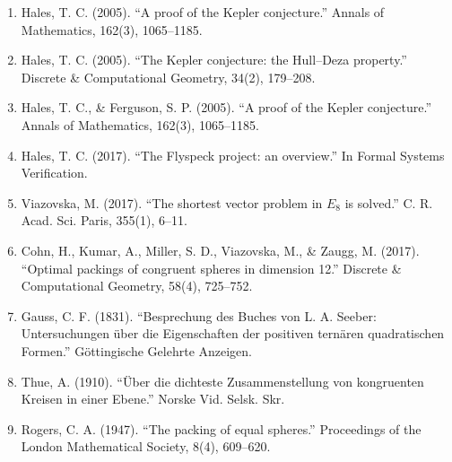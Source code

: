 \begin{enumerate}
\item Hales, T. C. (2005). ``A proof of the Kepler conjecture.'' Annals of Mathematics, 162(3), 1065--1185.
\item Hales, T. C. (2005). ``The Kepler conjecture: the Hull--Deza property.'' Discrete \& Computational Geometry, 34(2), 179--208.
\item Hales, T. C., \& Ferguson, S. P. (2005). ``A proof of the Kepler conjecture.'' Annals of Mathematics, 162(3), 1065--1185.
\item Hales, T. C. (2017). ``The Flyspeck project: an overview.'' In Formal Systems Verification.
\item Viazovska, M. (2017). ``The shortest vector problem in $E_8$ is solved.'' C. R. Acad. Sci. Paris, 355(1), 6--11.
\item Cohn, H., Kumar, A., Miller, S. D., Viazovska, M., \& Zaugg, M. (2017). ``Optimal packings of congruent spheres in dimension 12.'' Discrete \& Computational Geometry, 58(4), 725--752.
\item Gauss, C. F. (1831). ``Besprechung des Buches von L. A. Seeber: Untersuchungen über die Eigenschaften der positiven ternären quadratischen Formen.'' Göttingische Gelehrte Anzeigen.
\item Thue, A. (1910). ``Über die dichteste Zusammenstellung von kongruenten Kreisen in einer Ebene.'' Norske Vid. Selsk. Skr.
\item Rogers, C. A. (1947). ``The packing of equal spheres.'' Proceedings of the London Mathematical Society, 8(4), 609--620.
\end{enumerate}